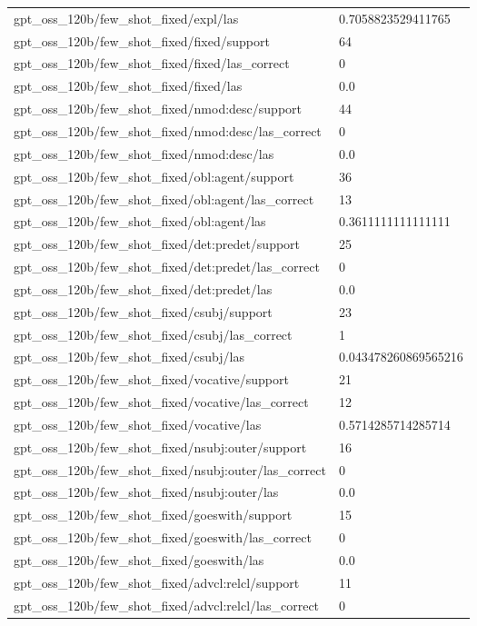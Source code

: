 \begin{tabular}{ll}
gpt\_oss\_120b/few\_shot\_fixed/expl/las & 0.7058823529411765 \\
gpt\_oss\_120b/few\_shot\_fixed/fixed/support & 64 \\
gpt\_oss\_120b/few\_shot\_fixed/fixed/las\_correct & 0 \\
gpt\_oss\_120b/few\_shot\_fixed/fixed/las & 0.0 \\
gpt\_oss\_120b/few\_shot\_fixed/nmod:desc/support & 44 \\
gpt\_oss\_120b/few\_shot\_fixed/nmod:desc/las\_correct & 0 \\
gpt\_oss\_120b/few\_shot\_fixed/nmod:desc/las & 0.0 \\
gpt\_oss\_120b/few\_shot\_fixed/obl:agent/support & 36 \\
gpt\_oss\_120b/few\_shot\_fixed/obl:agent/las\_correct & 13 \\
gpt\_oss\_120b/few\_shot\_fixed/obl:agent/las & 0.3611111111111111 \\
gpt\_oss\_120b/few\_shot\_fixed/det:predet/support & 25 \\
gpt\_oss\_120b/few\_shot\_fixed/det:predet/las\_correct & 0 \\
gpt\_oss\_120b/few\_shot\_fixed/det:predet/las & 0.0 \\
gpt\_oss\_120b/few\_shot\_fixed/csubj/support & 23 \\
gpt\_oss\_120b/few\_shot\_fixed/csubj/las\_correct & 1 \\
gpt\_oss\_120b/few\_shot\_fixed/csubj/las & 0.043478260869565216 \\
gpt\_oss\_120b/few\_shot\_fixed/vocative/support & 21 \\
gpt\_oss\_120b/few\_shot\_fixed/vocative/las\_correct & 12 \\
gpt\_oss\_120b/few\_shot\_fixed/vocative/las & 0.5714285714285714 \\
gpt\_oss\_120b/few\_shot\_fixed/nsubj:outer/support & 16 \\
gpt\_oss\_120b/few\_shot\_fixed/nsubj:outer/las\_correct & 0 \\
gpt\_oss\_120b/few\_shot\_fixed/nsubj:outer/las & 0.0 \\
gpt\_oss\_120b/few\_shot\_fixed/goeswith/support & 15 \\
gpt\_oss\_120b/few\_shot\_fixed/goeswith/las\_correct & 0 \\
gpt\_oss\_120b/few\_shot\_fixed/goeswith/las & 0.0 \\
gpt\_oss\_120b/few\_shot\_fixed/advcl:relcl/support & 11 \\
gpt\_oss\_120b/few\_shot\_fixed/advcl:relcl/las\_correct & 0 \\

\end{tabular}
